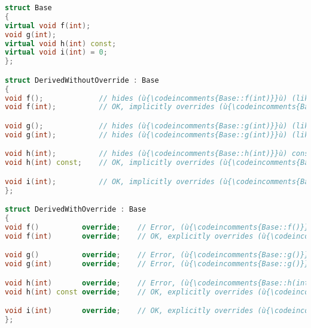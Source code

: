 %
%
%
%
\begin{lstlisting}[language=C++]
struct Base
{
virtual void f(int);
void g(int);
virtual void h(int) const;
virtual void i(int) = 0;
};

struct DerivedWithoutOverride : Base
{
void f();             // hides (ù{\codeincomments{Base::f(int)}}ù) (likely mistake)
void f(int);          // OK, implicitly overrides (ù{\codeincomments{Base::f(int) }}ù)

void g();             // hides (ù{\codeincomments{Base::g(int)}}ù) (likely mistake)
void g(int);          // hides (ù{\codeincomments{Base::g(int)}}ù) (likely mistake)

void h(int);          // hides (ù{\codeincomments{Base::h(int)}}ù) const (likely mistake)
void h(int) const;    // OK, implicitly overrides (ù{\codeincomments{Base::h(int)}}ù) const

void i(int);          // OK, implicitly overrides (ù{\codeincomments{Base::i(int)}}ù)
};

struct DerivedWithOverride : Base
{
void f()          override;    // Error, (ù{\codeincomments{Base::f()}}ù) not found
void f(int)       override;    // OK, explicitly overrides (ù{\codeincomments{Base::f(int)}}ù)

void g()          override;    // Error, (ù{\codeincomments{Base::g()}}ù) not found
void g(int)       override;    // Error, (ù{\codeincomments{Base::g()}}ù) is not virtual.

void h(int)       override;    // Error, (ù{\codeincomments{Base::h(int)}}ù) not found
void h(int) const override;    // OK, explicitly overrides (ù{\codeincomments{Base::h(int)}}ù)

void i(int)       override;    // OK, explicitly overrides (ù{\codeincomments{Base::i(int)}}ù)
};
\end{lstlisting}

